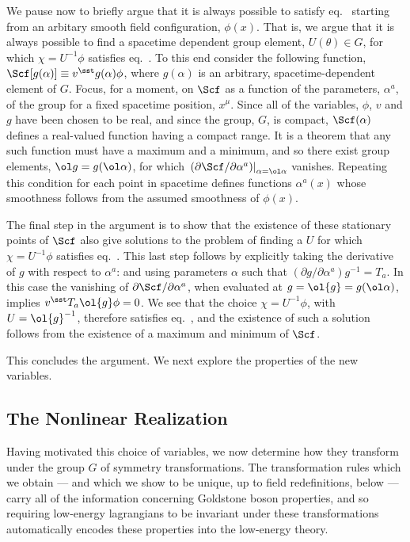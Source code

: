 \documentclass[12pt]{report}
\begin{document}
We pause now to briefly argue that it is always possible to
satisfy eq.~ starting from an arbitary smooth
field configuration, $\phi(x)$. That is, we argue that it
is always possible to find a spacetime dependent group
element, $U(\theta) \in G$, for which 
$\chi = U^{-1} \phi$ satisfies eq.~. 
To this end consider the following
function, $\Scf[g(\alpha)] \equiv v^\sst g(\alpha) \phi$,
where $g(\alpha)$ is an arbitrary, spacetime-dependent
element of $G$. Focus, for a moment, on $\Scf$ as a function
of the parameters, $\alpha^a$, of the group for a fixed
spacetime position, $x^\mu$. Since all of the variables,
$\phi$, $v$ and $g$ have been chosen to be real, and since
the group, $G$, is compact, $\Scf(\alpha)$ defines a
real-valued function having a compact range. It is a
theorem that any such function must have a maximum and a
minimum, and so there exist group elements, $\ol g =
g(\ol\alpha)$, for which $\left. 
(\partial \Scf / \partial\alpha^a) \right|_{\alpha =
\ol\alpha}$ vanishes. Repeating this condition for each
point in spacetime defines functions $\alpha^a(x)$ whose
smoothness follows from the assumed smoothness of $\phi(x)$.

The final step in the argument is to show that the
existence of these stationary points of $\Scf$ also give
solutions to the problem of finding a $U$ for which $\chi =
U^{-1} \phi$ satisfies 
eq.~. This last step follows by explicitly
taking the derivative of $g$ with respect to $\alpha^a$:
and using parameters $\alpha$ such that $(\partial g/
\partial \alpha^a) g^{-1} = T_a$. In this case the
vanishing of $\partial \Scf/ \partial\alpha^a$, when
evaluated at $g = \ol{g} = g(\ol\alpha)$, implies $v^\sst
T_a \ol{g} \phi = 0$. We see that the choice $\chi = U^{-1}
\phi$, with $U = \ol{g}^{-1}$, therefore satisfies
eq.~, and the existence of such a solution
follows from the existence of a maximum and minimum of
$\Scf$.

This concludes the argument. We next explore the properties
of the new variables.

\subsection{The Nonlinear Realization}

Having motivated this choice of variables, we now determine
how they transform under the group $G$ of symmetry
transformations. The transformation rules which we obtain
--- and which we show to be unique, up to field
redefinitions, below --- carry all of the information
concerning Goldstone boson properties, and so requiring
low-energy lagrangians to be invariant under these
transformations automatically encodes these properties into
the low-energy theory.
\end{document}
